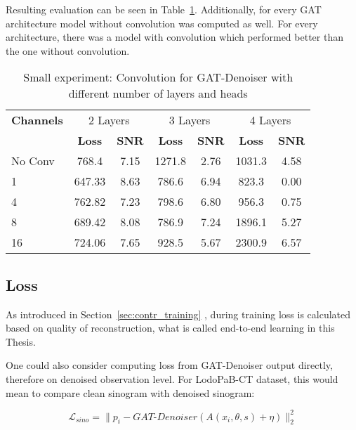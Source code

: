 Resulting evaluation can be seen in Table~\ref{tab:small_convolution_2}.
Additionally, for every GAT architecture model without convolution was computed as well.
For every architecture, there was a model with convolution which performed better than the one without convolution.


\begin{table}[H]
  \centering
  \begin{tabular}{l|cc|cc|cc}
    \toprule
    \textbf{Channels } & \multicolumn{2}{c|}{2 Layers} & \multicolumn{2}{c|}{3 Layers} & \multicolumn{2}{c}{4 Layers}  \\
                       & \textbf{Loss} & \textbf{SNR} & \textbf{Loss} & \textbf{SNR} & \textbf{Loss} & \textbf{SNR} \\ 
    \midrule
		No Conv & 768.4  & 7.15 & 1271.8 & 2.76 & 1031.3 & 4.58 \\ \hline
		1       & 647.33 & 8.63 & 786.6  & 6.94 & 823.3  & 0.00 \\ \hline
		4       & 762.82 & 7.23 & 798.6  & 6.80 & 956.3  & 0.75 \\ \hline
		8       & 689.42 & 8.08 & 786.9  & 7.24 & 1896.1 & 5.27 \\ \hline
		16      & 724.06 & 7.65 & 928.5  & 5.67 & 2300.9 & 6.57 \\

    \midrule
  \end{tabular}

  \caption{Small experiment: Convolution for GAT-Denoiser with different number of layers and heads}
  \label{tab:small_convolution_2}
\end{table}



\subsection{Loss}
As introduced in Section~\ref{sec:contr_training} \textit{},
during training loss is calculated based on quality of reconstruction, what is called
end-to-end learning in this Thesis.

One could also consider computing loss from GAT-Denoiser output directly, therefore on denoised observation level.
For LodoPaB-CT dataset, this would mean to compare clean sinogram with denoised sinogram:

\begin{equation}
  \label{eq:loss_sino}
  \mathcal{L}_{sino} = \parallel p_i - \textit{GAT-Denoiser}(A(x_i, \theta, s) + \eta) \parallel ^2_2
\end{equation}

